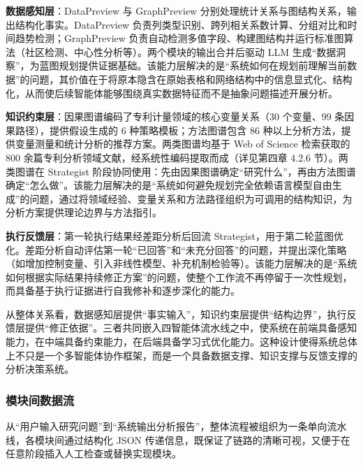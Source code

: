 \textbf{数据感知层}：DataPreview 与 GraphPreview 分别处理统计关系与图结构关系，输出结构化事实。DataPreview 负责列类型识别、跨列相关系数计算、分组对比和时间趋势检测；GraphPreview 负责自动检测多值字段、构建图结构并运行标准图算法（社区检测、中心性分析等）。两个模块的输出合并后驱动 LLM 生成“数据洞察”，为蓝图规划提供证据基础。该能力层解决的是“系统如何在规划前理解当前数据”的问题，其价值在于将原本隐含在原始表格和网络结构中的信息显式化、结构化，从而使后续智能体能够围绕真实数据特征而不是抽象问题描述开展分析。

\textbf{知识约束层}：因果图谱编码了专利计量领域的核心变量关系（30 个变量、99 条因果路径），提供假设生成的 6 种策略模板；方法图谱包含 86 种以上分析方法，提供变量测量和统计分析的推荐方案。两类图谱均基于 Web of Science 检索获取的 800 余篇专利分析领域文献，经系统性编码提取而成（详见第四章 4.2.6 节）。两类图谱在 Strategist 阶段协同使用：先由因果图谱确定“研究什么”，再由方法图谱确定“怎么做”\cite{pan2024unifying,liu2016knowledge}。该能力层解决的是“系统如何避免规划完全依赖语言模型自由生成”的问题，通过将领域经验、变量关系和方法路径组织为可调用的结构知识，为分析方案提供理论边界与方法指引。

\textbf{执行反馈层}：第一轮执行结果经差距分析后回流 Strategist，用于第二轮蓝图优化。差距分析自动评估第一轮“已回答”和“未充分回答”的问题，并提出深化策略（如增加控制变量、引入非线性模型、补充机制检验等）。该能力层解决的是“系统如何根据实际结果持续修正方案”的问题，使整个工作流不再停留于一次性规划，而具备基于执行证据进行自我修补和逐步深化的能力。

从整体关系看，数据感知层提供“事实输入”，知识约束层提供“结构边界”，执行反馈层提供“修正依据”。三者共同嵌入四智能体流水线之中，使系统在前端具备感知能力，在中端具备约束能力，在后端具备学习式优化能力。这种设计使得系统总体上不只是一个多智能体协作框架，而是一个具备数据支撑、知识支撑与反馈支撑的分析决策系统。

\subsubsection{模块间数据流}

从“用户输入研究问题”到“系统输出分析报告”，整体流程被组织为一条单向流水线，各模块间通过结构化 JSON 传递信息，既保证了链路的清晰可视，又便于在任意阶段插入人工检查或替换实现模块。

